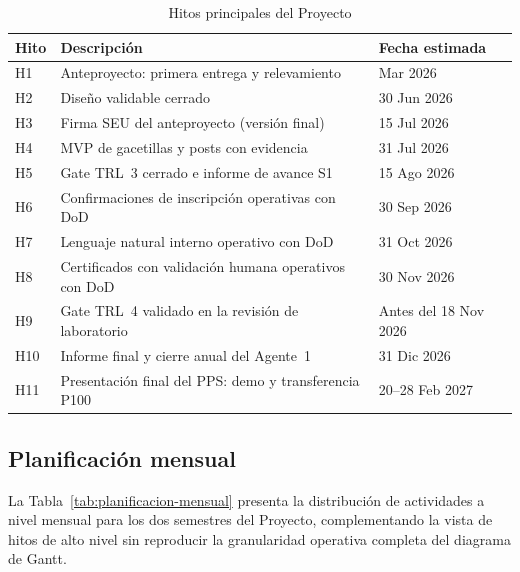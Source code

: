 \documentclass[a4paper, 12pt]{article}
\begin{document}
\begin{table}[H]
  \centering
  \caption{Hitos principales del Proyecto}
  \label{tab:hitos}
  \footnotesize
  \begin{tabularx}{\textwidth}{lXl}
    \toprule
    \textbf{Hito} & \textbf{Descripci\'on} & \textbf{Fecha estimada} \\
    \midrule
    H1 & Anteproyecto: primera entrega y relevamiento & Mar 2026 \\
    H2 & Dise\~no validable cerrado & 30 Jun 2026 \\
    H3 & Firma \ac{SEU} del anteproyecto (versi\'on final) & 15 Jul 2026 \\
    H4 & \ac{MVP} de gacetillas y posts con evidencia & 31 Jul 2026 \\
    H5 & Gate \ac{TRL}~3 cerrado e informe de avance S1 & 15 Ago 2026 \\
    H6 & Confirmaciones de inscripci\'on operativas con \ac{DoD} & 30 Sep 2026 \\
    H7 & Lenguaje natural interno operativo con \ac{DoD} & 31 Oct 2026 \\
    H8 & Certificados con validaci\'on humana operativos con \ac{DoD} & 30 Nov 2026 \\
    H9 & Gate \ac{TRL}~4 validado en la revisi\'on de laboratorio & Antes del 18 Nov 2026 \\
    H10 & Informe final y cierre anual del Agente~1 & 31 Dic 2026 \\
    H11 & Presentaci\'on final del PPS: demo y transferencia \ac{P100} & 20--28 Feb 2027 \\
    \bottomrule
  \end{tabularx}
\end{table}

\subsection{Planificaci\'on mensual}

La Tabla~\ref{tab:planificacion-mensual} presenta la distribuci\'on de actividades a nivel mensual para los dos semestres del Proyecto, complementando la vista de hitos de alto nivel sin reproducir la granularidad operativa completa del diagrama de Gantt.
\end{document}
